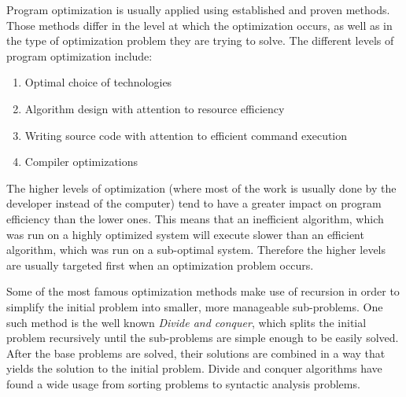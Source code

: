 \documentclass[a4paper]{report}
\begin{document}
Program optimization is usually applied using established and proven methods. Those methods differ in the level at which the optimization occurs, as well as in the type of optimization problem they are trying to solve. The different levels of program optimization include:
\begin{enumerate}
    \item Optimal choice of technologies
    \item Algorithm design with attention to resource efficiency
    \item Writing source code with attention to efficient command execution
    \item Compiler optimizations
\end{enumerate}

The higher levels of optimization (where most of the work is usually done by the developer instead of the computer) tend to have a greater impact on program efficiency than the lower ones. This means that an inefficient algorithm, which was run on a highly optimized system will execute slower than an efficient algorithm, which was run on a sub-optimal system. Therefore the higher levels are usually targeted first when an optimization problem occurs.
    
Some of the most famous optimization methods make use of recursion in order to simplify the initial problem into smaller, more manageable sub-problems. One such method is the well known \textit{Divide and conquer}, which splits the initial problem recursively until the sub-problems are simple enough to be easily solved. After the base problems are solved, their solutions are combined in a way that yields the solution to the initial problem. Divide and conquer algorithms have found a wide usage from sorting problems to syntactic analysis problems. \cite{algs_intro}
\end{document}
